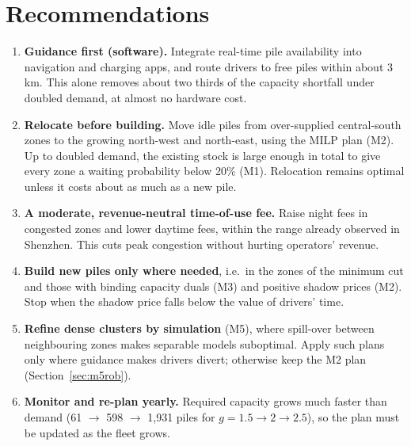 \documentclass[11pt,a4paper]{article}
\begin{document}
\section{Recommendations}
\begin{enumerate}[leftmargin=1.5em,itemsep=2pt]
\item \textbf{Guidance first (software).} Integrate real-time pile availability into navigation and charging apps, and route drivers to free piles within about 3\,km. This alone removes about two thirds of the capacity shortfall under doubled demand, at almost no hardware cost.
\item \textbf{Relocate before building.} Move idle piles from over-supplied central-south zones to the growing north-west and north-east, using the MILP plan (M2). Up to doubled demand, the existing stock is large enough in total to give every zone a waiting probability below 20\% (M1). Relocation remains optimal unless it costs about as much as a new pile.
\item \textbf{A moderate, revenue-neutral time-of-use fee.} Raise night fees in congested zones and lower daytime fees, within the range already observed in Shenzhen. This cuts peak congestion without hurting operators' revenue.
\item \textbf{Build new piles only where needed}, i.e.\ in the zones of the minimum cut and those with binding capacity duals (M3) and positive shadow prices (M2). Stop when the shadow price falls below the value of drivers' time.
\item \textbf{Refine dense clusters by simulation} (M5), where spill-over between neighbouring zones makes separable models suboptimal. Apply such plans only where guidance makes drivers divert; otherwise keep the M2 plan (Section~\ref{sec:m5rob}).
\item \textbf{Monitor and re-plan yearly.} Required capacity grows much faster than demand (61 $\to$ 598 $\to$ 1{,}931 piles for $g = 1.5 \to 2 \to 2.5$), so the plan must be updated as the fleet grows.
\end{enumerate}

\end{document}
